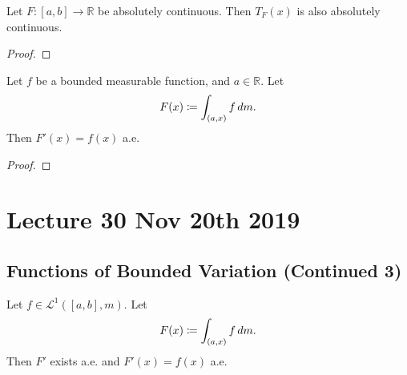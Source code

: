 \documentclass[notoc,notitlepage]{tufte-book}
\begin{document}
\begin{lemma}\label{lemma:total_variation_of_absolutely_continuous_functions_are_absolutely_continuous}
  Let $F : [a, b] \to \mathbb{R}$ be absolutely continuous.
  Then $T_F(x)$ is also absolutely continuous.
\end{lemma}

\begin{proof}
\end{proof}

\begin{lemma}\label{lemma:building_block_for_fundamental_theorem_of_calculus_for_general_measures}
  Let $f$ be a bounded measurable function, and $a \in \mathbb{R}$. Let
  \begin{equation*}
    F(x) \coloneqq \int_{(a, x)} f \mathop{}\!d{m}.
  \end{equation*}
  Then $F'(x) = f(x)$ a.e.
\end{lemma}

\begin{proof}
\end{proof}



\chapter{Lecture 30 Nov 20th 2019}%
\label{chp:lecture_30_nov_20th_2019}

\section{Functions of Bounded Variation (Continued 3)}%
\label{sec:functions_of_bounded_variation_continued_3}

\begin{thm}\label{thm:anti_derivative_of_bounded_integrable_functions}
  Let $f \in \mathcal{L}^1([a, b], m)$. Let
  \begin{equation*}
    F(x) \coloneqq \int_{(a, x)} f \mathop{}\!d{m}.
  \end{equation*}
  Then $F'$ exists a.e. and $F'(x) = f(x)$ a.e.
\end{thm}
\end{document}
